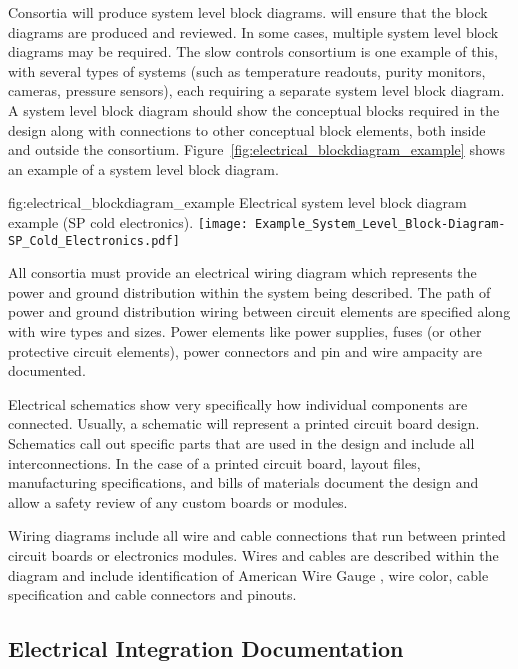 Consortia will produce system level block
diagrams.  will ensure that the
block diagrams are produced and reviewed.  In some cases, multiple
system level block diagrams may be required.  The slow controls consortium is one example of this, with several types of systems (such as temperature 
readouts, purity monitors, cameras, pressure sensors), each
requiring a separate system level block diagram. A system level block
diagram should show the conceptual blocks required in the design along with connections to other conceptual block elements, both inside and outside the consortium.  
Figure~\ref{fig:electrical_blockdiagram_example} shows an example of a system level block diagram.
\begin{dunefigure}{fig:electrical_blockdiagram_example}
  {Electrical system level block diagram example (SP cold electronics).}
 \texttt{[image: Example\_System\_Level\_Block-Diagram-SP\_Cold\_Electronics.pdf]}
\end{dunefigure}


All consortia must provide an electrical wiring diagram which represents the power and ground
distribution within the system being described.  The path of power and
ground distribution wiring between circuit elements are
specified along with wire types and sizes.  Power elements like power supplies, fuses (or other protective circuit elements),
power connectors and pin and wire ampacity are documented.


Electrical schematics show very specifically how individual
components are connected.  Usually, a schematic will represent a
printed circuit board design.  Schematics call out specific
parts that are used in the design and include all interconnections.
In the case of a printed circuit board, layout files, manufacturing
specifications, and bills of materials document
the design and allow a safety review of any custom boards or
modules.


Wiring diagrams include all wire and cable connections that
run between printed circuit boards or electronics modules.  Wires and
cables are described within the diagram and
include identification of American Wire Gauge , wire color, cable specification
and cable connectors and pinouts.





\subsection{Electrical Integration Documentation}
\label{sec:fdsp-coord-integ-electrical}

